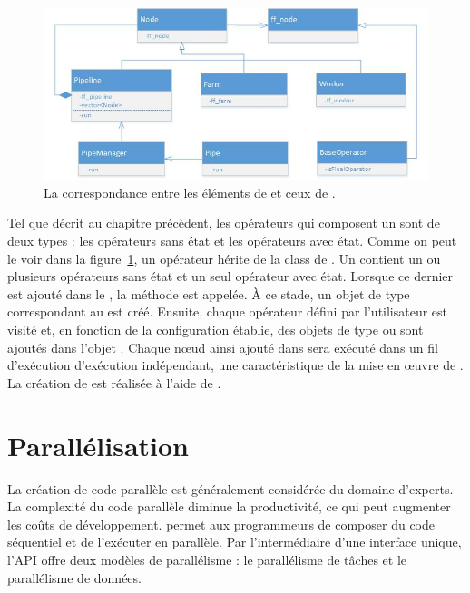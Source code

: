 \begin{figure}[ht]
\centering
     \includegraphics[width=1.0\textwidth]{Figures/MapToFastFlow.jpg}
      \caption{La correspondance entre les \'el\'ements de  et ceux de  .}
       \label{MapToFastFlow.fig}
\end{figure}


Tel que d\'ecrit au chapitre pr\'ec\`edent, les op\'erateurs qui composent un  sont de deux types : les op\'erateurs sans \'etat et les op\'erateurs avec \'etat. Comme on peut le voir dans la figure~\ref{MapToFastFlow.fig}, un op\'erateur h\'erite de la class  de . Un  contient un ou plusieurs op\'erateurs sans \'etat et un seul op\'erateur avec \'etat. Lorsque ce dernier est ajout\'e dans le , la m\'ethode  est appel\'ee. \`A ce stade, un objet de type  correspondant au  est cr\'e\'e. Ensuite, chaque op\'erateur d\'efini par l'utilisateur est visit\'e et, en fonction de la configuration \'etablie, des objets de type  ou  sont ajout\'es dans l'objet . Chaque nœud ainsi ajout\'e dans  sera ex\'ecut\'e dans un fil d'ex\'ecution d'ex\'ecution ind\'ependant, une caract\'eristique de la mise en \oe{}uvre de .
La cr\'eation de  est r\'ealis\'ee \`a l'aide de .


\section{Parall\'elisation}

La cr\'eation de code parall\`ele est g\'en\'eralement consid\'er\'ee du domaine d'experts. La complexit\'e du code parall\`ele diminue la productivit\'e, ce qui peut augmenter les co\^uts de d\'eveloppement.  permet aux programmeurs de composer du code s\'equentiel et de l'ex\'ecuter en parall\`ele. Par l'interm\'ediaire d'une interface unique, l'API offre deux mod\`eles de parall\'elisme : le parall\'elisme de t\^aches et le parall\'elisme de donn\'ees.

